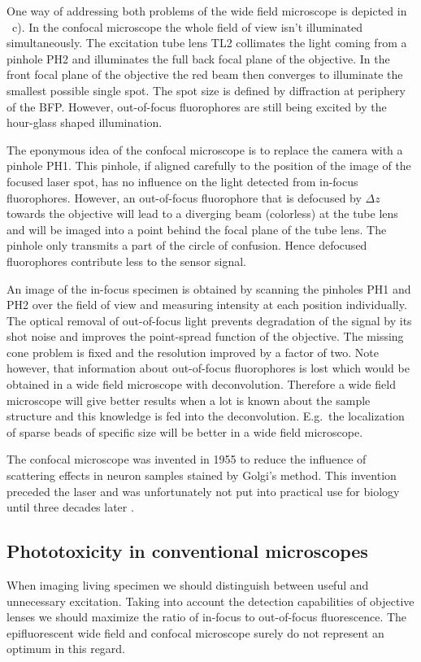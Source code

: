 One way of addressing both problems of the wide field microscope is
depicted in ~c). In the confocal
microscope the whole field of view isn't illuminated simultaneously.
The excitation tube lens TL2 collimates the light coming from a
pinhole PH2 and illuminates the full back focal plane of the
objective. In the front focal plane of the objective the red beam then
converges to illuminate the smallest possible single spot. The spot
size is defined by diffraction at periphery of the BFP. However,
out-of-focus fluorophores are still being excited by the hour-glass
shaped illumination.

The eponymous idea of the confocal microscope is to replace the camera
with a pinhole PH1. This pinhole, if aligned carefully to the position
of the image of the focused laser spot, has no influence on the light
detected from in-focus fluorophores. However, an out-of-focus
fluorophore that is defocused by $\Delta z$ towards the objective will
lead to a diverging beam (colorless) at the tube lens and will be
imaged into a point behind the focal plane of the tube lens. The
pinhole only transmits a part of the circle of confusion. Hence
defocused fluorophores contribute less to the sensor signal.

An image of the in-focus specimen is obtained by scanning the pinholes
PH1 and PH2 over the field of view and measuring intensity at each
position individually. The optical removal of out-of-focus light
prevents degradation of the signal by its shot noise and improves the
point-spread function of the objective. The missing cone problem is
fixed and the resolution improved by a factor of two. Note however,
that information about out-of-focus fluorophores is lost which would
be obtained in a wide field microscope with deconvolution. Therefore a
wide field microscope will give better results when a lot is known
about the sample structure and this knowledge is fed into the
deconvolution. E.g.\ the localization of sparse beads of specific size
will be better in a wide field microscope.

The confocal microscope was invented in 1955  \citep{Minsky1961,Minsky1988} to reduce the influence of
scattering effects in neuron samples stained by Golgi's method. This
invention preceded the laser and was unfortunately not put into
practical use for biology until three decades later \citep{Amos1987}.
\subsection{Phototoxicity in conventional microscopes}
When imaging living specimen we should distinguish between useful and
unnecessary excitation. Taking into account the detection capabilities
of objective lenses we should maximize the ratio of in-focus to
out-of-focus fluorescence. The epifluorescent wide field and confocal
microscope surely do not represent an optimum in this regard.

